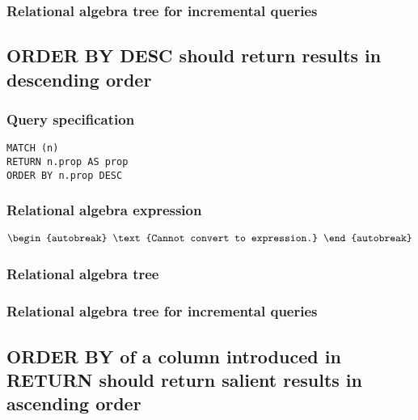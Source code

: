 
\subsubsection*{Relational algebra tree for incremental queries}


\subsection{ORDER BY DESC should return results in descending order}

\subsubsection*{Query specification}

\begin{lstlisting}
MATCH (n)
RETURN n.prop AS prop
ORDER BY n.prop DESC
\end{lstlisting}

\subsubsection*{Relational algebra expression}

\begin{align*}
\begin{autobreak}
\text{Cannot convert to expression.}
\end{autobreak}
\end{align*}

\subsubsection*{Relational algebra tree}


\subsubsection*{Relational algebra tree for incremental queries}


\subsection{ORDER BY of a column introduced in RETURN should return salient results in ascending order}

